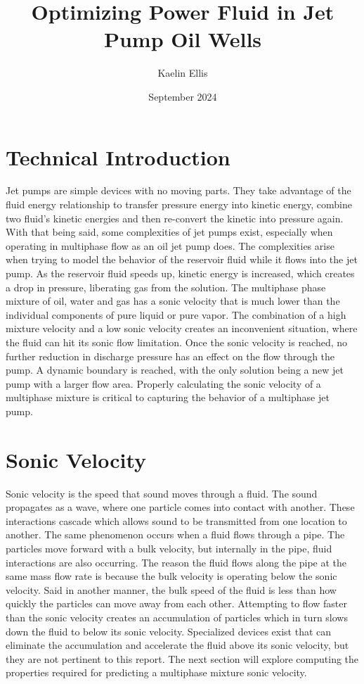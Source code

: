 \documentclass[12 pt]{report}
\title{Optimizing Power Fluid in Jet Pump Oil Wells}
\author{Kaelin Ellis}
\date{September 2024}
\begin{document}
\maketitle

\section{Technical Introduction}

Jet pumps are simple devices with no moving parts. They take advantage of the fluid energy relationship to transfer pressure energy into kinetic energy, combine two fluid’s kinetic energies and then re-convert the kinetic into pressure again. With that being said, some complexities of jet pumps exist, especially when operating in multiphase flow as an oil jet pump does. The complexities arise when trying to model the behavior of the reservoir fluid while it flows into the jet pump. As the reservoir fluid speeds up, kinetic energy is increased, which creates a drop in pressure, liberating gas from the solution. The multiphase phase mixture of oil, water and gas has a sonic velocity that is much lower than the individual components of pure liquid or pure vapor.  The combination of a high mixture velocity and a low sonic velocity creates an inconvenient situation, where the fluid can hit its sonic flow limitation. Once the sonic velocity is reached, no further reduction in discharge pressure has an effect on the flow through the pump. A dynamic boundary is reached, with the only solution being a new jet pump with a larger flow area. Properly calculating the sonic velocity of a multiphase mixture is critical to capturing the behavior of a multiphase jet pump.

\section{Sonic Velocity}

Sonic velocity is the speed that sound moves through a fluid. The sound propagates as a wave, where one particle comes into contact with another. These interactions cascade which allows sound to be transmitted from one location to another. The same phenomenon occurs when a fluid flows through a pipe. The particles move forward with a bulk velocity, but internally in the pipe, fluid interactions are also occurring. The reason the fluid flows along the pipe at the same mass flow rate is because the bulk velocity is operating below the sonic velocity. Said in another manner, the bulk speed of the fluid is less than how quickly the particles can move away from each other. Attempting to flow faster than the sonic velocity creates an accumulation of particles which in turn slows down the fluid to below its sonic velocity. Specialized devices exist that can eliminate the accumulation and accelerate the fluid above its sonic velocity, but they are not pertinent to this report. The next section will explore computing the properties required for predicting a multiphase mixture sonic velocity.
\end{document}
